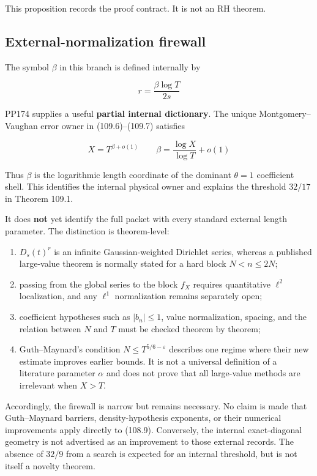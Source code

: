 \documentclass[
  11pt,
]{book}
\providecommand{\tightlist}{%
  \setlength{\itemsep}{0pt}\setlength{\parskip}{0pt}}
\begin{document}
This proposition records the proof contract. It is not an RH theorem.

\subsection{External-normalization
firewall}\label{external-normalization-firewall}

The symbol \(\beta\) in this branch is defined internally by

\[
r=\frac{\beta\log T}{2s}
\tag{113.3}
\]

PP174 supplies a useful \textbf{partial internal dictionary}. The unique
Montgomery--Vaughan error owner in (109.6)--(109.7) satisfies

\[
\boxed{
X=T^{\beta+o(1)}
\qquad
\beta=\frac{\log X}{\log T}+o(1)}
\tag{113.4}
\]

Thus \(\beta\) is the logarithmic length coordinate of the dominant
\(\theta=1\) coefficient shell. This identifies the internal physical
owner and explains the threshold \(32/17\) in Theorem 109.1.

It does \textbf{not} yet identify the full packet with every standard
external length parameter. The distinction is theorem-level:

\begin{enumerate}
\def\labelenumi{\arabic{enumi}.}
\tightlist
\item
  \(D_s(t)^r\) is an infinite Gaussian-weighted Dirichlet series,
  whereas a published large-value theorem is normally stated for a hard
  block \(N<n\le2N\);
\item
  passing from the global series to the block \(f_X\) requires
  quantitative \(\ell^2\) localization, and any \(\ell^1\) normalization
  remains separately open;
\item
  coefficient hypotheses such as \(|b_n|\le1\), value normalization,
  spacing, and the relation between \(N\) and \(T\) must be checked
  theorem by theorem;
\item
  Guth--Maynard's condition \(N\le T^{5/6-\varepsilon}\) describes one
  regime where their new estimate improves earlier bounds. It is not a
  universal definition of a literature parameter \(\alpha\) and does not
  prove that all large-value methods are irrelevant when \(X>T\).
\end{enumerate}

Accordingly, the firewall is narrow but remains necessary. No claim is
made that Guth--Maynard barriers, density-hypothesis exponents, or their
numerical improvements apply directly to (108.9). Conversely, the
internal exact-diagonal geometry is not advertised as an improvement to
those external records. The absence of \(32/9\) from a search is
expected for an internal threshold, but is not itself a novelty theorem.
\end{document}
